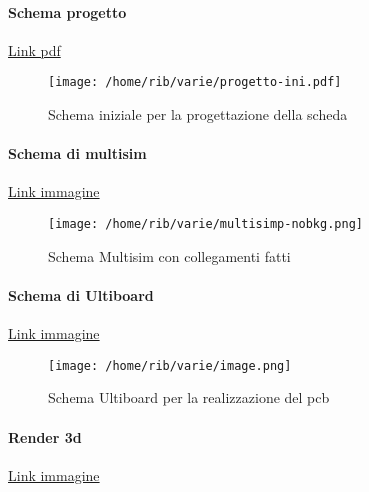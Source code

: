 \documentclass{article}
\begin{document}
\paragraph{Schema progetto}
\href{https://drive.google.com/file/d/1qK_MUvGxWjfc9fLc7l3a6s5mL5L6D6fg/view?usp=sharing}{Link pdf}
\begin{figure}[H]
   \centering
        \texttt{[image: /home/rib/varie/progetto-ini.pdf]}
       \label{prog}
       \caption{Schema iniziale per la progettazione della scheda}
\end{figure}

\paragraph{Schema di multisim}
\href{https://drive.google.com/file/d/1VOPnspiu-4T2ZOR6uaUWNH1DUEd0fUcg/view?usp=sharing}{Link immagine}
\begin{figure}[H]
   \centering
        \texttt{[image: /home/rib/varie/multisimp-nobkg.png]}
       \label{multisim}
       \caption{Schema Multisim con collegamenti fatti}
\end{figure}

\paragraph{Schema di Ultiboard}
\href{https://drive.google.com/file/d/1ZlJ_AIXvgzdlvAawX5noBu48i03zm5dP/view?usp=sharing}{Link immagine}
\begin{figure}[H]
    \centering
        \texttt{[image: /home/rib/varie/image.png]}
        \label{ultiabroad}
        \caption{Schema Ultiboard per la realizzazione del pcb}
\end{figure}

\paragraph{Render 3d}
\href{https://drive.google.com/file/d/1EMIzjUSU50ij58dLTjCctJGQM4YIgIii/view?usp=sharing}{Link immagine}
\end{document}
